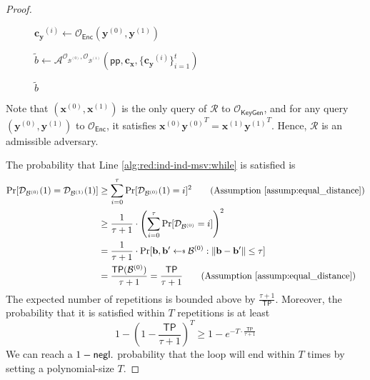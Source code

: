 \begin{proof}
\begin{figure}[h]
\begin{minipage}[t]{0.5\linewidth}
\begin{algorithm}[H]
\begin{algorithmic}[1]


			\State $\mathbf{c_y}^{(i)} \gets \mathcal{O}_{\textsf{Enc}}(\mathbf{y}^{(0)}, \mathbf{y}^{(1)})$ \label{alg:red:ind-ind-msv:cy}

		\EndFor

		\State $\tilde{b} \gets {\mathcal{A}}^{\mathcal{O}_{\mathcal{B}^{(0)}}, \mathcal{O}_{\mathcal{B}^{(1)}} } (\textsf{pp}, \mathbf{c_x}, \{ \mathbf{c_y}^{(i)} \}_{i=1}^t )$ \label{alg:red:ind-ind-msv:A}

		\State \Return $\tilde{b}$

	\end{algorithmic}
	\end{algorithm}
	\end{minipage}
	
\end{figure}

\noindent Note that $(\mathbf{x}^{(0)}, \mathbf{x}^{(1)})$ is the only query of $\mathcal{R}$ to $\mathcal{O}_{\textsf{KeyGen}}$, and for any query $( \mathbf{y}^{(0)}, {\mathbf{y}^{(1)}} )$ to $\mathcal{O}_{\textsf{Enc}}$, it satisfies $\mathbf{x}^{(0)}{\mathbf{y}^{(0)}}^T = \mathbf{x}^{(1)}{\mathbf{y}^{(1)}}^T$. Hence, $\mathcal{R}$ is an admissible adversary.

The probability that Line \ref{alg:red:ind-ind-msv:while} is satisfied is
\begin{align*}
	\Pr[\mathcal{D}_{\mathcal{B}^{(0)}}(1) = \mathcal{D}_{\mathcal{B}^{(1)}}(1)] 
	&\geq \sum_{i=0}^\tau \Pr[\mathcal{D}_{\mathcal{B}^{(0)}}(1) = i]^2 \qquad \text{(Assumption \ref{assump:equal_distance})} \\
	&\geq \frac{1}{\tau + 1} \cdot \left( \sum_{i=0}^\tau \Pr[\mathcal{D}_{\mathcal{B}^{(0)}}=i] \right)^2 \\
	&= \frac{1}{\tau + 1} \cdot \Pr[ \mathbf{b}, \mathbf{b}^\prime \getsdollar \mathcal{B}^{(0)} : \| \mathbf{b} - \mathbf{b}^\prime \| \leq \tau ] \\
	&= \frac{\textsf{TP}(\mathcal{B}^{(0)})}{\tau + 1} = \frac{\textsf{TP}}{\tau + 1} \qquad \text{(Assumption \ref{assump:equal_distance})} 
\end{align*}
The expected number of repetitions is bounded above by $\frac{\tau + 1}{ \textsf{TP} }$. Moreover, the probability that it is satisfied within $T$ repetitions is at least
\[
	1 - (1 - \frac{\textsf{TP}}{\tau + 1})^T \geq 1 - e^{-T \cdot \frac{\textsf{TP}}{\tau + 1}}
\]
We can reach a $1 - \mathsf{negl}.$ probability that the loop will end within $T$ times by setting a polynomial-size $T$.


\end{proof}
